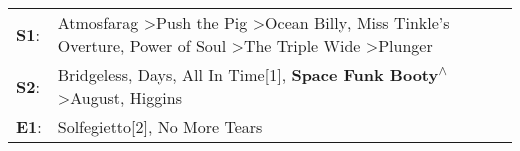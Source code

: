 \begin{supertabular}{p{0.03\textwidth}p{0.92\textwidth}}
 \textbf{S1}:  &  Atmosfarag\textsuperscript{} \textgreater \enspace Push the Pig\textsuperscript{} \textgreater \enspace Ocean Billy\textsuperscript{}, \enspace Miss Tinkle's Overture\textsuperscript{}, \enspace Power of Soul\textsuperscript{} \textgreater \enspace The Triple Wide\textsuperscript{} \textgreater \enspace Plunger\textsuperscript{}  \enspace  \\
 \textbf{S2}:  &                                                                                Bridgeless\textsuperscript{},  Days\textsuperscript{}, \enspace All In Time[1]\textsuperscript{}, \enspace \textbf{Space Funk Booty\textsuperscript{$\wedge$}} \textgreater \enspace August\textsuperscript{}, \enspace Higgins\textsuperscript{}  \enspace  \\
 \textbf{E1}:  &                                                                                                                                                                                                                                                                  Solfegietto[2]\textsuperscript{}, \enspace No More Tears\textsuperscript{}  \enspace  \\
\end{supertabular}

